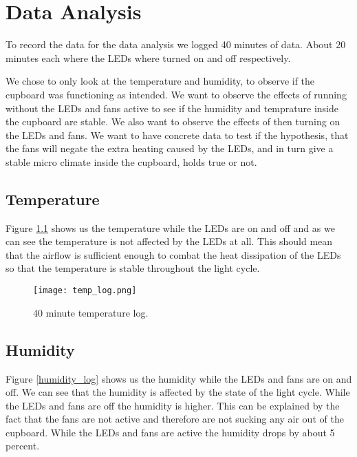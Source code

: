 \documentclass[12pt,a4paper,oneside]{book}
\begin{document}

\chapter{Data Analysis}
To record the data for the data analysis we logged 40 minutes of data. About 20 minutes each where the LEDs where turned on and off respectively.

We chose to only look at the temperature and humidity, to observe if the cupboard was functioning as intended.
We want to observe the effects of running without the LEDs and fans active to see if the humidity and temprature inside the cupboard are stable.
We also want to observe the effects of then turning on the LEDs and fans.
We want to have concrete data to test if the hypothesis, that the fans will negate the extra heating caused by the LEDs, and in turn give a stable micro climate inside the cupboard, holds true or not.

\newpage

\section{Temperature}
Figure \ref{temp_log} shows us the temperature while the LEDs are on and off and as we can see the temperature is not affected by the LEDs at all. This should mean that the airflow is sufficient enough to combat the heat dissipation of the LEDs so that the temperature is stable throughout the light cycle.

\begin{figure}[h]
    \begin{center}
        \label{temp_log}
        \texttt{[image: temp\_log.png]}
        \caption{40 minute temperature log.}
    \end{center}
\end{figure}

\newpage

\section{Humidity}
Figure \ref{humidity_log} shows us the humidity while the LEDs and fans are on and off. We can see that the humidity is affected by the state of the light cycle. While the LEDs and fans are off the humidity is higher. This can be explained by the fact that the fans are not active and therefore are not sucking any air out of the cupboard. While the LEDs and fans are active the humidity drops by about 5 percent.
\end{document}
